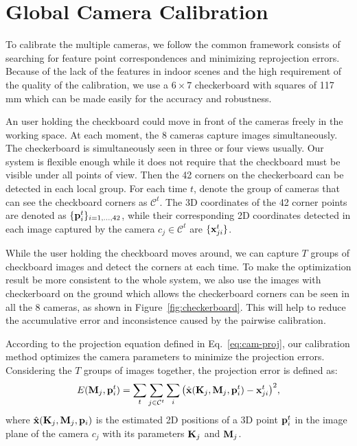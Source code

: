 
\section{Global Camera Calibration}
\label{sec:global-calib}


To calibrate the multiple cameras, we follow the common framework consists of searching for feature point correspondences and minimizing reprojection errors. 
%
Because of the lack of the features in indoor scenes and the high requirement of the quality of the calibration, we use a $6\times7$ checkerboard with squares of 117 mm which can be made easily for the accuracy and robustness. 

%
An user holding the checkboard could move in front of the cameras freely in the working space. 
At each moment, the 8 cameras capture images simultaneously. 
%
The checkerboard is simultaneously seen in three or four views usually. 
%
Our system is flexible enough while it does not require that the checkboard must be visible under all points of view.
%
Then the 42 corners on the checkerboard can be detected in each local group.
%
For each time $t$, denote the group of cameras that can see the checkboard corners as $\mathcal{C}^t$. The 3D coordinates of the 42 corner points are denoted as $\{\mathbf{p}^{t}_{i}\}_{i=1,\ldots, 42}$, while their corresponding 2D coordinates detected in each image captured by the camera $c_j \in \mathcal{C}^{t}$ are $\{\mathbf{x}^{t}_{ji}\}$. 



While the user holding the checkboard moves around, we can capture $T$ groups of checkboard images and detect the corners at each time. 
%
To make the optimization result be more consistent to the whole system, we also use the images with checkerboard on the ground which allows the checkerboard corners can be seen in all the 8 cameras, as shown in Figure~\ref{fig:checkerboard}. This will help to reduce the accumulative error and inconsistence caused by the pairwise calibration. 

According to the projection equation defined in Eq.~\ref{eq:cam-proj}, our calibration method optimizes the camera parameters to minimize the projection errors. Considering the $T$ groups of images together, the projection error is defined as: 
%
\begin{equation} \label{eq:global-proj-error}
E(\mathbf{M}_{j},\mathbf{p}^{t}_{i})=\sum_{t}\sum_{j\in \mathcal{C}^{t}}\sum_{i} \big( \hat{\mathbf{x}}(\mathbf{K}_{j},\mathbf{M}_{j}, \mathbf{p}^{t}_{i})-\mathbf{x}^{t}_{ji} \big)^{2},
\end{equation}
%
where $\hat{\mathbf{x}}(\mathbf{K}_{j},\mathbf{M}_{j}, \mathbf{p}_{i})$ is the estimated 2D positions of a 3D point $\mathbf{p}^{t}_{i}$ in the image plane of the camera $c_j$ with its parameters $\mathbf{K}_j$ and $\mathbf{M}_j$.


